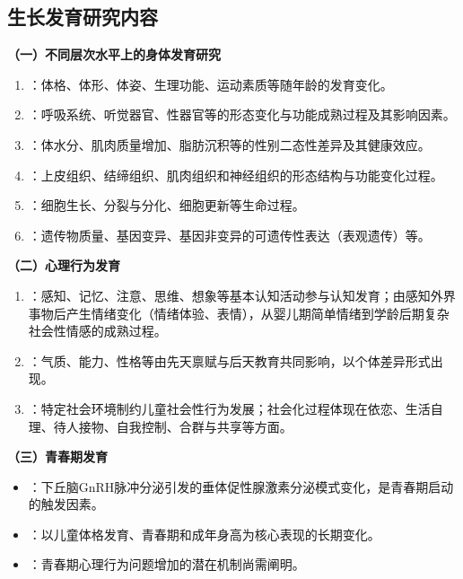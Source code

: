\subsection{生长发育研究内容}

\begin{defbox}
\textbf{（一）不同层次水平上的身体发育研究}

\begin{enumerate}[leftmargin=*]
    \item {}：体格、体形、体姿、生理功能、运动素质等随年龄的发育变化。
    \item {}：呼吸系统、听觉器官、性器官等的形态变化与功能成熟过程及其影响因素。
    \item {}：体水分、肌肉质量增加、脂肪沉积等的性别二态性差异及其健康效应。
    \item {}：上皮组织、结缔组织、肌肉组织和神经组织的形态结构与功能变化过程。
    \item {}：细胞生长、分裂与分化、细胞更新等生命过程。
    \item {}：遗传物质量、基因变异、基因非变异的可遗传性表达（表观遗传）等。
\end{enumerate}
\end{defbox}

\begin{keybox}
\textbf{（二）心理行为发育}

\begin{enumerate}[leftmargin=*]
    \item {}：感知、记忆、注意、思维、想象等基本认知活动参与认知发育；由感知外界事物后产生情绪变化（情绪体验、表情），从婴儿期简单情绪到学龄后期复杂社会性情感的成熟过程。
    \item {}：气质、能力、性格等由先天禀赋与后天教育共同影响，以个体差异形式出现。
    \item {}：特定社会环境制约儿童社会性行为发展；社会化过程体现在依恋、生活自理、待人接物、自我控制、合群与共享等方面。
\end{enumerate}
\end{keybox}

\begin{defbox}
\textbf{（三）青春期发育}

\begin{itemize}[leftmargin=*]
    \item {}：下丘脑GnRH脉冲分泌引发的垂体促性腺激素分泌模式变化，是青春期启动的触发因素。
    \item {}：以儿童体格发育、青春期和成年身高为核心表现的长期变化。
    \item {}：青春期心理行为问题增加的潜在机制尚需阐明。
\end{itemize}
\end{defbox}

